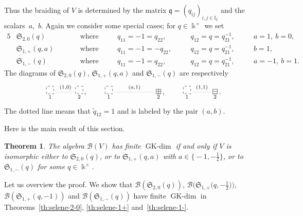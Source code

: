 \documentclass[10pt,a4paper]{amsart}
\numberwithin{equation}{section}
\newtheorem{Theorem}{Theorem}[section]
\newcommand{\GK}{\operatorname{GK-dim}}
\newcommand{\toba}{\mathscr B}
\newcommand{\sele}{\mathfrak{S}}
\newcommand{\I}{{\mathbb I}}
\newcommand{\bq}{\mathfrak{q}}
\begin{document}
Thus the braiding of $V$ is determined by the matrix $\bq = (q_{ij})_{i,j \in \I_{2}}$
and the scalars~$a$,~$b$.
Again we consider some special cases; for $q \in \Bbbk^{\times}$ we set
\begin{alignat}{5}\label{eq:selene-defi-20}
&\sele_{2,0}(q) &&\text{where} &&q_{11} = -1 = q_{22}, && q_{12} = q = q_{21}^{-1}, \quad&& a=1, \ b=0,
\\ \label{eq:selene-defi-1+}
&\sele_{1,+}(q, a) \qquad&&\text{where}\quad &&q_{11} = -1 =- q_{22}, \quad&& q_{12} = q = q_{21}^{-1}, && b=1,
\\ \label{eq:selene-defi-1-}
&\sele_{1,-}(q) &&\text{where} &&q_{11} = -1 = q_{22}, && q_{12} = q = q_{21}^{-1}, && a= -1, \ b=1.
\end{alignat}
The diagrams of $\sele_{2,0}(q)$, $\sele_{1,+}(q, a)$ and $\sele_{1,-}(q)$ are respectively
$$
\xymatrix{
\underset{1}{\begin{tikzpicture}
\draw[dashed] (0,0) rectangle (0.36,0.36);
\end{tikzpicture}} \ar@{.}^{(1,0)}[r]
&\underset{2}{\begin{tikzpicture}
\draw[dashed] (0,0) rectangle (0.36,0.36);
\end{tikzpicture}}\, ,}
\qquad
\xymatrix{
\underset{1}{\begin{tikzpicture}
\draw[dashed] (0,0) rectangle (0.36,0.36);
\end{tikzpicture}} \ar @{.}^{(a,1)}[rr]
& & \underset{2}{\boxplus}\,,}
\qquad
\xymatrix{
\underset{1}{\begin{tikzpicture}
\draw[dashed] (0,0) rectangle (0.36,0.36);
\end{tikzpicture}} \ar @{.}^{(1,1)}[r]
& \underset{2}{\boxminus}\,.}
$$
The dotted line means that
$\widetilde{q}_{12}=1$ and is labeled by the pair $(a,b)$.

Here is the main result of this section.

\begin{Theorem} \label{th:2-blocks}
The algebra $\toba (V)$ has finite $\GK$ if and only if $V$ is isomorphic
either to $\sele_{2,0}(q)$, or to $\sele_{1,+}(q, a)$ with $a \in \bigl\{-1, -\frac12\bigr\}$, or to $\sele_{1,-}(q)$ for some $q\in \Bbbk^{\times}$.
\end{Theorem}

Let us overview the proof.
We show that $\toba(\sele_{2,0}(q))$, $\toba\big(\sele_{1,+}\big(q,-\frac{1}{2}\big)\big)$, $\toba(\sele_{1,+}(q,-1))$ and $\toba(\sele_{1,-}(q))$
have finite $\GK$ in Theorems~\ref{th:selene-2-0}, \ref{th:selene-1+} and~\ref{th:selene-1-}.
\end{document}
